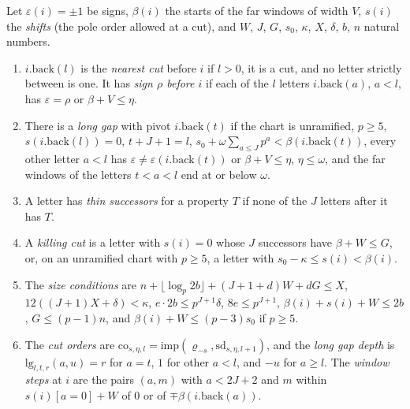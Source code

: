 \begin{definition}[Cuts]\label{def:cuts}
Let $\varepsilon(i)=\pm1$ be signs, $\beta(i)$ the starts of the far windows of width $V$, $s(i)$ the \emph{shifts} (the pole order allowed at a cut), and $W$, $J$, $G$, $s_0$, $\kappa$, $X$, $\delta$, $b$, $n$ natural numbers.
\begin{enumerate}[label=\textup{(C\arabic*)}]
\item $i.\mathrm{back}(l)$ is the \emph{nearest cut} before $i$ if $l>0$, it is a cut, and no letter strictly between is one. It has \emph{sign $\rho$ before $i$} if each of the $l$ letters $i.\mathrm{back}(a)$, $a<l$, has $\varepsilon=\rho$ or $\beta+V\le\eta$.
\item There is a \emph{long gap} with pivot $i.\mathrm{back}(t)$ if the chart is unramified, $p\ge5$, $s(i.\mathrm{back}(l))=0$, $t+J+1=l$, $s_0+\omega\sum_{a\le J}p^a<\beta(i.\mathrm{back}(t))$, every other letter $a<l$ has $\varepsilon\ne\varepsilon(i.\mathrm{back}(t))$ or $\beta+V\le\eta$, $\eta\le\omega$, and the far windows of the letters
$t<a<l$ end at or below $\omega$.
\item A letter has \emph{thin successors} for a property $T$ if none of the $J$ letters after it has $T$.
\item A \emph{killing cut} is a letter with $s(i)=0$ whose $J$ successors have $\beta+W\le G$, or, on an unramified chart with $p\ge5$, a letter with $s_0-\kappa\le s(i)<\beta(i)$.
\item The \emph{size conditions} are $n+\lfloor\log_p2b\rfloor+(J+1+d)W+dG\le X$, $12((J+1)X+\delta)<\kappa$, $e\cdot2b\le p^{J+1}\delta$, $8e\le p^{J+1}$, $\beta(i)+s(i)+W\le2b$, $G\le(p-1)n$, and $\beta(i)+W\le(p-3)s_0$ if $p\ge5$.
\item The \emph{cut orders} are $\mathrm{co}_{s,\eta,l}=\mathrm{imp}(\varrho_{-s},\mathrm{sd}_{s,\eta,l+1})$, and the \emph{long gap depth} is $\mathrm{lg}_{l,t,r}(a,u)=r$ for $a=t$, $1$ for other $a<l$, and $-u$ for $a\ge l$. The \emph{window steps} at $i$ are the pairs $(a,m)$ with $a<2J+2$ and $m$ within $s(i)[a=0]+W$ of $0$ or of
$\mp\beta(i.\mathrm{back}(a))$.
\end{enumerate}
\end{definition}

